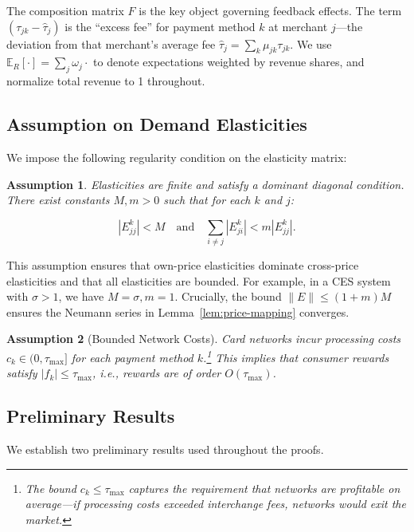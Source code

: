 \documentclass[11pt,english]{article}
\newtheorem{assumption}{Assumption}
\theoremstyle{remark}
\begin{document}
\noindent The composition matrix $F$ is the key object governing feedback effects. The term $(\tau_{jk} - \hat{\tau}_j)$ is the ``excess fee'' for payment method $k$ at merchant $j$---the deviation from that merchant's average fee $\hat{\tau}_j = \sum_k \mu_{jk} \tau_{jk}$. We use $\mathbb{E}_R[\cdot] = \sum_j \omega_j \cdot $ to denote expectations weighted by revenue shares, and normalize total revenue to 1 throughout.

\subsection{Assumption on Demand Elasticities}

We impose the following regularity condition on the elasticity matrix:

\begin{assumption}\label{assump:dominant-diagonal}
Elasticities are finite and satisfy a dominant diagonal condition.
There exist constants $M, m > 0$ such that for each $k$ and $j$:

\[
|E^k_{jj}| < M \quad \text{and} \quad \sum_{i \neq j} |E^k_{ji}| < m |E^k_{jj}|.
\]
\end{assumption}

This assumption ensures that own-price elasticities dominate cross-price elasticities and that all elasticities are bounded.
For example, in a CES system with $\sigma > 1$, we have $M=\sigma, m=1$.
Crucially, the bound $\|E\| \leq (1+m)M$ ensures the Neumann series in Lemma~\ref{lem:price-mapping} converges.

\begin{assumption}[Bounded Network Costs]\label{assump:positive-costs}
Card networks incur processing costs $c_k \in (0, \tau_{\max}]$ for each payment method $k$.\footnote{The bound $c_k \leq \tau_{\max}$ captures the requirement that networks are profitable on average---if processing costs exceeded interchange fees, networks would exit the market.}
This implies that consumer rewards satisfy $|f_k| \leq \tau_{\max}$, i.e., rewards are of order $O(\tau_{\max})$.

\end{assumption}

\subsection{Preliminary Results}\label{subsec:preliminary}

We establish two preliminary results used throughout the proofs.
\end{document}
